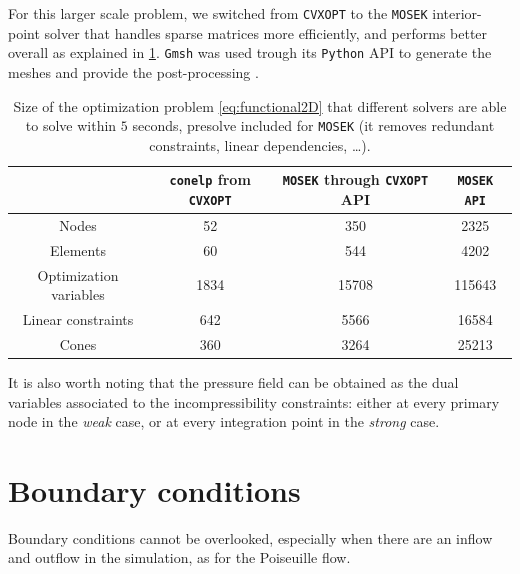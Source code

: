 \documentclass[11 pt]{report}
\begin{document}
For this larger scale problem, we switched from \texttt{CVXOPT} \cite{cvxopt} to the \texttt{MOSEK} interior-point solver \cite{mosek} that handles sparse matrices more efficiently, and performs better overall as explained in \cref{tab:solvers}. \texttt{Gmsh} was used trough its \texttt{Python} API to generate the meshes and provide the post-processing \cite{geuzaine2009gmsh}.
\begin{table}[h]
    \centering
    \begin{tabular}[t]{cccc}
        \toprule
         & \texttt{conelp} from \texttt{CVXOPT} \quad & \quad  \texttt{MOSEK} through \texttt{CVXOPT} API \quad & \quad \texttt{MOSEK API}\\
        \midrule
        Nodes & 52 & 350 & 2325\\
        Elements & 60 & 544 & 4202\\
        \midrule
        Optimization variables & 1834 & 15708 & 115643\\
        Linear constraints & 642 & 5566 & 16584\\
        Cones & 360 & 3264 & 25213\\
        \bottomrule
    \end{tabular}
    \caption{Size of the optimization problem \eqref{eq:functional2D} that different solvers are able to solve within $5$ seconds, presolve included for \texttt{MOSEK} (it removes redundant constraints, linear dependencies, \dots).}
    \label{tab:solvers}
\end{table}%


\vspace{-8pt}
It is also worth noting that the pressure field can be obtained as the dual variables associated to the incompressibility constraints: either at every primary node in the \textit{weak} case, or at every integration point in the \textit{strong} case.

\section{Boundary conditions}
\label{sec:boundary_conditions}
Boundary conditions cannot be overlooked, especially when there are an inflow and outflow in the simulation, as for the Poiseuille flow.
\end{document}
